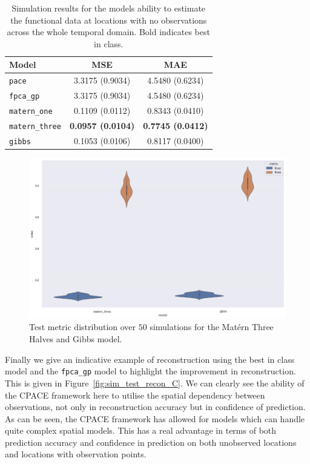 \begin{table}
	\caption[Simulation results for Scenario C on test data]{Simulation results for the models ability to estimate the functional data at locations with no observations across the whole temporal domain. Bold indicates best in class.}
	\centering
	\label{tab:test_C}
	\begin{tabular}{lcc}
		\toprule
		\textbf{Model} & \textbf{MSE} & \textbf{MAE} \\
		\midrule
		\verb*|pace| & 3.3175 (0.9034) & 4.5480	(0.6234) \\
		\verb*|fpca_gp| & 3.3175 (0.9034) & 4.5480	(0.6234)  \\
		\verb*|matern_one| & 0.1109	(0.0112) & 0.8343 (0.0410) \\
		\verb*|matern_three| & \textbf{0.0957 (0.0104)} & \textbf{0.7745 (0.0412)} \\
		\verb*|gibbs| & 0.1053 (0.0106) & 0.8117 (0.0400)\\
		\bottomrule
	\end{tabular}
\end{table}

\begin{figure}
	\centering
	\includegraphics[width=\textwidth]{test_met_C}
	\caption{Test metric distribution over $50$ simulations for the Mat\'ern Three Halves and Gibbs model.}
	\label{fig:test_met_C}
\end{figure}

Finally we give an indicative example of reconstruction using the best in class model and the \verb*|fpca_gp| model to highlight the improvement in reconstruction. 
This is given in Figure~\ref{fig:sim_test_recon_C}. 
We can clearly see the ability of the CPACE framework here to utilise the spatial dependency between observations, not only in reconstruction accuracy but in confidence of prediction.
As can be seen, the CPACE framework has allowed for models which can handle quite complex spatial models. 
This has a real advantage in terms of both prediction accuracy and confidence in prediction on both unobserved locations and locations with observation points. 

